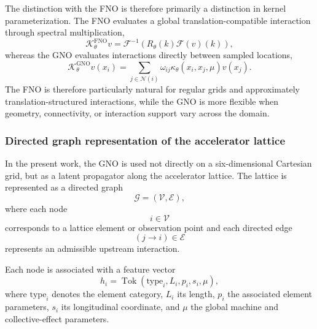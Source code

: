 \documentclass[11pt,a4paper]{article}
\begin{document}
\begin{sloppypar}
The distinction with the FNO is therefore primarily a distinction in kernel parameterization. The FNO evaluates a global translation-compatible interaction through spectral multiplication,
\begin{equation}
\mathcal{K}_{\theta}^{\mathrm{FNO}}v
=
\mathcal{F}^{-1}
\left(
R_{\theta}(k)\mathcal{F}(v)(k)
\right),
\end{equation}
whereas the GNO evaluates interactions directly between sampled locations,
\begin{equation}
\mathcal{K}_{\theta}^{\mathrm{GNO}}v(x_i)
=
\sum_{j\in\mathcal{N}(i)}
\omega_{ij}
\kappa_{\theta}(x_i,x_j,\mu)
v(x_j).
\label{eq:gno_vs_fno}
\end{equation}
The FNO is therefore particularly natural for regular grids and approximately translation-structured interactions, while the GNO is more flexible when geometry, connectivity, or interaction support vary across the domain.

\subsubsection{Directed graph representation of the accelerator lattice}
\label{subsubsec:gno_lattice_graph}

In the present work, the GNO is used not directly on a six-dimensional Cartesian grid, but as a latent propagator along the accelerator lattice. The lattice is represented as a directed graph
\begin{equation}
\mathcal{G}
=
(\mathcal{V},\mathcal{E}),
\end{equation}
where each node
\begin{equation}
i\in\mathcal{V}
\end{equation}
corresponds to a lattice element or observation point and each directed edge
\begin{equation}
(j\rightarrow i)\in\mathcal{E}
\end{equation}
represents an admissible upstream interaction.

Each node is associated with a feature vector
\begin{equation}
h_i
=
\operatorname{Tok}
\left(
\mathrm{type}_i,
L_i,
p_i,
s_i,
\mu
\right),
\label{eq:gno_node_token}
\end{equation}
where $\mathrm{type}_i$ denotes the element category, $L_i$ its length, $p_i$ the associated element parameters, $s_i$ its longitudinal coordinate, and $\mu$ the global machine and collective-effect parameters.


\end{sloppypar}
\end{document}
